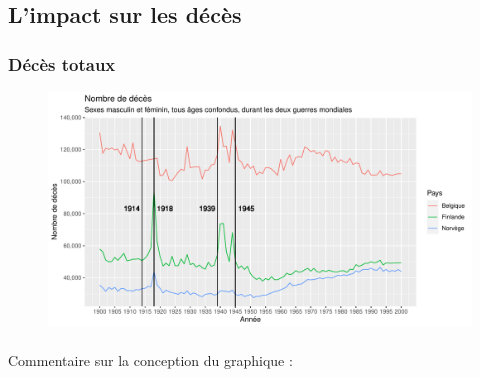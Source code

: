 \documentclass{article}
\begin{document}
\subsection{L'impact sur les décès}
\subsubsection{Décès totaux}
\begin{figure}[htbp]
\centering
\includegraphics[width=\linewidth]{graph_nbrmorts_total.pdf}
\end{figure}
\paragraph{}
Commentaire sur la conception du graphique : 
\end{document}
